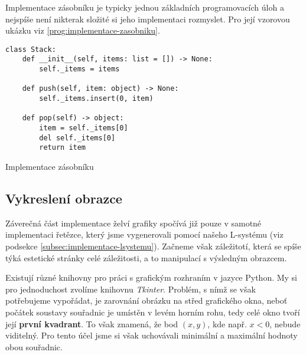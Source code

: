 Implementace zásobníku je typicky jednou základních programovacích úloh a nejspíše není nikterak složité si jeho implementaci rozmyslet. Pro její vzorovou ukázku viz \ref{prog:implementace-zasobniku}.
\begin{program}[h]
\begin{lstlisting}[style=python]
class Stack:
    def __init__(self, items: list = []) -> None:
        self._items = items

    def push(self, item: object) -> None:
        self._items.insert(0, item)
    
    def pop(self) -> object:
        item = self._items[0]
        del self._items[0]
        return item  
\end{lstlisting}
    \caption{Implementace zásobníku}
    \label{prog:implementace-zasobniku}
\end{program}

\subsection{Vykreslení obrazce}\label{subsec:vykresleni-obrazce}

Záverečná část implementace želví grafiky spočívá již pouze v samotné implementaci řetězce, který jsme vygenerovali pomocí našeho L-systému (viz podsekce \ref{subsec:implementace-lsystemu}). Začneme však záležitotí, která se spíše týká estetické stránky celé záležitosti, a to manipulací s výsledným obrazcem.

Existují různé knihovny pro práci s grafickým rozhraním v jazyce Python. My si pro jednoduchost zvolíme knihovnu \emph{Tkinter}. Problém, s nímž se však potřebujeme vypořádat, je zarovnání obrázku na střed grafického okna, neboť počátek soustavy souřadnic je umístěn v levém horním rohu, tedy celé okno tvoří její \textbf{první kvadrant}. To však znamená, že bod $(x,y)$, kde např. $x<0$, nebude viditelný. Pro tento účel jsme si však uchovávali minimální a maximální hodnoty obou souřadnic.